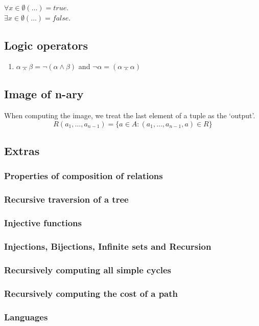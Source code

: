\documentclass[twocolumn,a4paper]{article}
\newcommand{\image}[1]{
\begin{figure}[ht]
	\centering
	\fbox{\resizebox{0.95\columnwidth}{!}{\texttt{[image: \#1]}}}
\end{figure}
}
\begin{document}
\(\forall x\in\emptyset(\ldots) = true\). \\
\(\exists x\in\emptyset(\ldots) = false\).

\subsection*{Logic operators}
\begin{enumerate}
	\item $\alpha \barwedge \beta = \neg (\alpha \wedge \beta)$ and $\neg \alpha = (\alpha \barwedge \alpha)$
\end{enumerate}

\subsection*{Image of n-ary}
When computing the image, we treat the last element of a tuple as the `output'.
\begin{equation}
	R(a_1, \ldots, a_{n-1}) = \{a \in A : (a_1, \ldots, a_{n-1}, a) \in R \}
\end{equation}

\newpage
\subsection*{Extras}

\subsubsection*{Properties of composition of relations}
\image{2017_1/2017a/uppg3.png}

\newpage
\subsubsection*{Recursive traversion of a tree}
\image{2017_1/2017a/uppg5.png}

\newpage
\subsubsection*{Injective functions}
\image{2017_1/2017a/uppg4.png}

\newpage
\subsubsection*{Injections, Bijections, Infinite sets and Recursion}
\image{misc/2018-2-2.png}

\newpage
\subsubsection*{Recursively computing all simple cycles}
\image{misc/vertecies-uppg.png}

\newpage
\subsubsection*{Recursively computing the cost of a path}
\image{misc/5-1.png}

\newpage
\subsubsection*{Languages}
\image{misc/languages.png}
\end{document}
